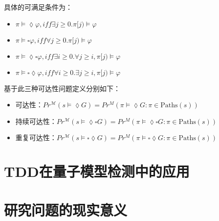 具体的可满足条件为：
\begin{itemize}
    \item \(\pi\models\lozenge\varphi,iff\exists j\ge0.\pi[j)\models\varphi\)
    \item \(\pi\models\square\varphi,iff\forall j\ge 0.\pi[j)\models\varphi\)
    \item \(\pi\models\lozenge\square\varphi,iff\exists i\ge 0.\forall j\ge i,\pi[j)\models\varphi\)
    \item \(\pi\models\square\lozenge\varphi,iff\forall i\ge 0.\exists j\ge i,\pi[j)\models\varphi\)
\end{itemize}
基于此三种可达性问题定义分别如下：
\begin{itemize}
    \item 可达性：\( Pr^{\mathcal{M}}(s \models \lozenge G) = Pr^M(\pi \models \lozenge G : \pi \in \text{Paths}(s))\)
    \item 持续可达性：\( Pr^{\mathcal{M}}(s \models \lozenge \square G) = Pr^M(\pi \models \lozenge \square G : \pi \in \text{Paths}(s))\)
    \item 重复可达性：\( Pr^{\mathcal{M}}(s \models\square \lozenge G) = Pr^M(\pi \models \square\lozenge G : \pi \in \text{Paths}(s))\)
\end{itemize}

\section{TDD在量子模型检测中的应用}

\section{研究问题的现实意义}
